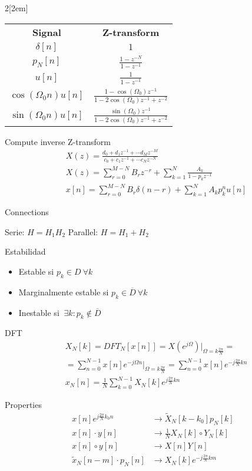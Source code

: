 \documentclass[leqno]{article}
\begin{document}
\begin{multicols}{2}[\columnsep2em]
\begin{center}
\begin{tabular}{cc}
  \textbf{Signal} & \textbf{Z-transform}\\
  $\delta[n]$ & $1$ \\
  $p_N[n]$ &  $\frac{1-z^{-N}}{1-z^{-1}}$ \\
  $u[n]$ &  $\frac{1}{1-z^{-1}}$ \\
  $\cos(\Omega_0n)u[n]$ & $\frac{1-\cos(\Omega_0)z^{-1}}{1-2\cos(\Omega _0)z^{-1}+z^{-2}}$\\
  $\sin(\Omega_0n)u[n]$ & $\frac{\sin(\Omega_0)z^{-1}}{1-2\cos(\Omega _0)z^{-1}+z^{-2}}$
\end{tabular}
\end{center}

Compute inverse Z-transform
\begin{align*}
  & X(z) = \frac{d_0+d_1z^{-1}+\cdots d_Mz^{-M}}{c_0 + c_1z^{-1} + \cdots c_Nz^{-N}} \\
  & X(z) = \sum_{r=0}^{M-N} B_rz^{-r} + \sum_{k=1}^{N} \frac{A_k}{1-p_kz^{-1}}\\
  & x[n] = \sum_{r=0}^{M-N} B_r \delta(n-r) + \sum_{k=1}^{N}A_kp_k^n u[n]
\end{align*}

Connections

Serie: $H = H_1H_2$ \quad Parallel:  $H = H_1+H_2$

Estabilidad
\begin{itemize}[topsep=-6pt, itemsep=0pt]
  \item Estable si $p_k \in D \ \forall k$
  \item Marginalmente estable si $p_k \in \overline{D} \ \forall k$ 
  \item Inestable si $\ \exists k: p_k \not\in \overline{D}$ 
\end{itemize}

DFT
\begin{align*}
  & X_N[k]  = DFT_{N}[x[n]] = X(e^{j\Omega})|_{\Omega = k \frac{2\pi}{N}} =\\
  &= \sum_{n=0}^{N-1}x[n]e^{-j\Omega n} |_{\Omega =k \frac{2\pi}{N}} = \sum_{n=0}^{N-1}x[n]e^{-j \frac{2\pi}{N}kn} \\
  & x_N[n] = \frac{1}{N}\sum_{k=0}^{N-1} X_N[k]e^{j \frac{2\pi}{N}kn}
\end{align*}

Properties
\begin{align*}
  x[n]e^{j \frac{2\pi}{N}k_0n} &\to \tilde{X}_{N}[k-k_0]p_N[k]\\
  x[n]\cdot y[n] &\to \frac{1}{N} X_N[k]\circ Y_N[k]\\
  x[n] \circ y[n] & \to  X[n]Y[n]\\
  \tilde{x}_N[n-m]\cdot p_N[n] &\to X_N[k]e^{-j \frac{2\pi}{N}km}
\end{align*}


\end{multicols}
\end{document}
